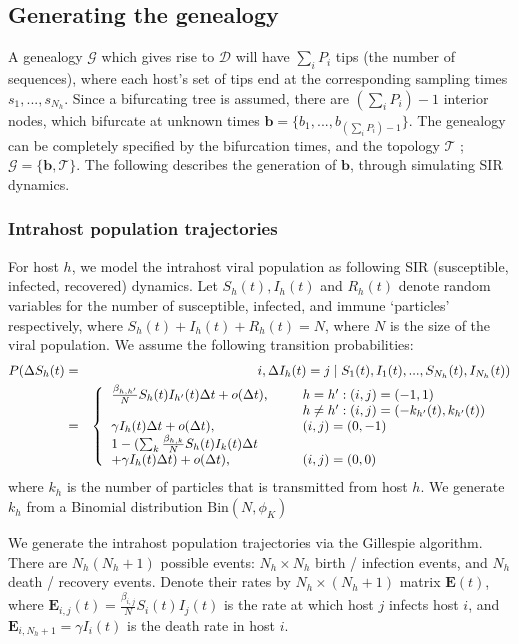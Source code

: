 \documentclass[a4paper,18pt]{report}
\begin{document}
\subsection{Generating the genealogy}
A genealogy $\mathcal{G}$ which gives rise to $\mathcal{D}$ will have $\sum_i P_i$ tips (the number of sequences), where each host's set of tips end at the corresponding sampling times $s_1,...,s_{N_h}$. Since a bifurcating tree is assumed, there are $(\sum_i P_i)-1$ interior nodes, which bifurcate at unknown times $\mathbf{b}=\{b_1,...,b_{(\sum_i P_i)-1}\}$. The genealogy can be completely specified by the bifurcation times, and the topology $\mathcal{T}$ ; $\mathcal{G}=\{\mathbf{b}, \mathcal{T}\}$. The following describes the generation of $\mathbf{b}$, through simulating SIR dynamics.
\subsubsection{Intrahost population trajectories}
For host $h$, we model the intrahost viral population as following SIR (susceptible, infected, recovered) dynamics. Let $S_h(t), I_h(t)$ and $R_h(t)$ denote random variables for the 
number of susceptible, infected, and immune `particles' respectively, where $S_h(t) + I_h(t) + R_h(t) = N$, where $N$ is the size of the viral population. We assume the following transition probabilities:
\begin{eqnarray}
P(\Delta S_h(t) &=& i, \Delta I_h(t) = j \mid S_1(t), I_1(t),..., S_{N_h}(t), I_{N_h}(t)) \label{eq:sirprocess}\\
&=& \left\{\begin{tabular}{l l l}
$\frac{\beta_{h,h'}}{N}S_h(t)I_{h'}(t)\Delta t + o(\Delta t)$, \hspace{0.4cm} & $h= h' : (i,j)=(-1,1)$ &  \\ 
& $h \neq h' : (i,j)=(-k_{h'}(t),k_{h'}(t))$ & \\
$\gamma I_h(t) \Delta t + o(\Delta t)$, & $(i,j)=(0,-1)$ & \nonumber\\
$1 - (\sum_k \frac{\beta_{h,k}}{N}S_h(t)I_k(t)\Delta t $ &  &\\
$+ \gamma I_h(t) \Delta t) + o(\Delta t)$, & $(i,j)=(0,0)$ &
\end{tabular}\right.
\end{eqnarray}
where $k_h$ is the number of particles that is transmitted from host $h$. We generate $k_h$ from a Binomial distribution $\textrm{Bin}(N, \phi_K)$

We generate the intrahost population trajectories via the Gillespie algorithm. There are $N_h(N_h+1)$ possible events:
$N_h \times N_h$ birth / infection events, and  $N_h$ death / recovery events. Denote their rates by $N_h \times (N_h+1)$ matrix $\mathbf{E}(t)$,
where $\mathbf{E}_{i,j}(t)=\frac{\beta_{i,j}}{N}S_i(t)I_j(t)$ is the rate at which host $j$ infects host $i$, and $\mathbf{E}_{i,N_h+1} = \gamma I_i(t)$ is the death rate in host $i$.
\end{document}
